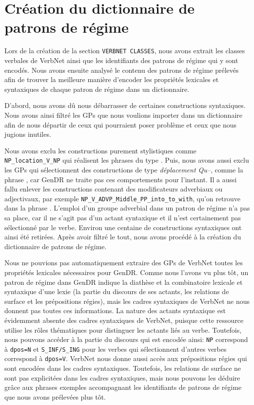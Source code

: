 \section{Création du dictionnaire de patrons de régime}\label{sec:creategpcon}


Lors de la création de la section \texttt{VERBNET CLASSES}, nous avons extrait les classes verbales de VerbNet ainsi que les identifiants des patrons de régime qui y sont encodés. Nous avons ensuite analysé le contenu des patrons de régime prélevés afin de trouver la meilleure manière d'encoder les propriétés lexicales et syntaxiques de chaque patron de régime dans un dictionnaire.

D'abord, nous avons dû nous débarrasser de certaines constructions syntaxiques. Nous avons ainsi filtré les \acp{GP} que nous voulions importer dans un dictionnaire afin de nous départir de ceux qui pourraient poser problème et ceux que nous jugions inutiles.

Nous avons exclu les constructions purement stylistiques comme \lstinline|NP_location_V_NP| qui réalisent les phrases du type . Puis, nous avons aussi exclu les \acp{GP} qui sélectionnent des constructions de type \emph{déplacement Qu--}, comme la phrase , car GenDR ne traite pas ces comportements pour l'instant. Il a aussi fallu enlever les constructions contenant des modificateurs adverbiaux ou adjectivaux, par exemple \lstinline|NP_V_ADVP_Middle_PP_into_to_with|, qu'on retrouve dans la phrase . L'emploi d'un groupe adverbial dans un patron de régime n'a pas sa place, car il ne s'agit pas d'un actant syntaxique et il n'est certainement pas sélectionné par le verbe. Environ une centaine de constructions syntaxiques ont ainsi été retirées. Après avoir filtré le tout, nous avons procédé à la création du dictionnaire de patrons de régime.

Nous ne pouvions pas automatiquement extraire des \acp{GP} de VerbNet toutes les propriétés lexicales nécessaires pour GenDR. Comme nous l'avons vu plus tôt, un patron de régime dans GenDR indique la diathèse et la combinatoire lexicale et syntaxique d'une lexie (la partie du discours de ses actants, les relations de surface et les prépositions régies), mais les cadres syntaxiques de VerbNet ne nous donnent pas toutes ces informations. La nature des actants syntaxique est évidemment absente des cadres syntaxiques de VerbNet, puisque cette ressource utilise les rôles thématiques pour distinguer les actants liés au verbe. Toutefois, nous pouvons accéder à la partie du discours qui est encodée ainsi: \texttt{NP} correspond à \texttt{dpos=N} et \texttt{S\_INF/S\_ING} pour les verbes qui sélectionnent d'autres verbes correspond à \texttt{dpos=V}. VerbNet nous donne aussi accès aux prépositions régies qui sont encodées dans les cadres syntaxiques. Toutefois, les relations de surface ne sont pas explicitées dans les cadres syntaxiques, mais nous pouvons les déduire grâce aux phrases exemples accompagnant les identifiants de patrons de régime que nous avons prélevées plus tôt.

